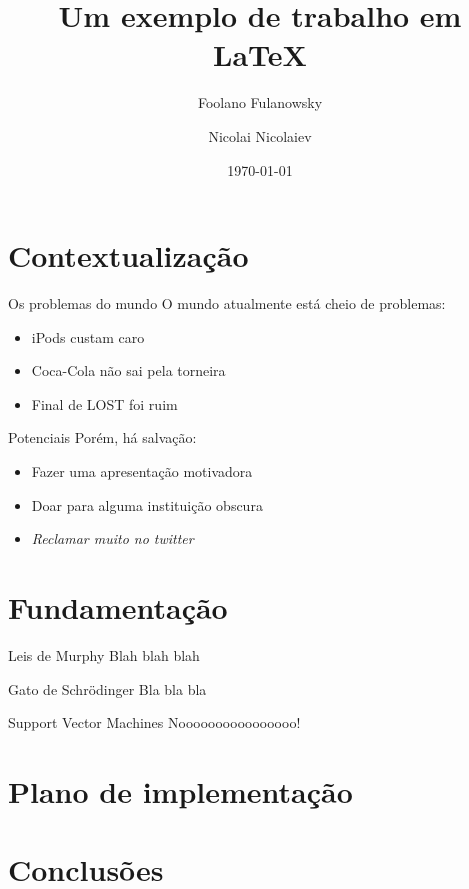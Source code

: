 \documentclass{beamer}
\institute{Universidade Tuiuti do Paraná}
\author{Foolano Fulanowsky \and Nicolai Nicolaiev}
\title{Um exemplo de trabalho em \LaTeX{}}
\date{\today}
\begin{document}
\frame{\titlepage}

\section{Contextualização}
\begin{frame}{Os problemas do mundo}
O mundo atualmente está cheio de problemas:
\begin{itemize}
  \item iPods custam caro
  \item Coca-Cola não sai pela torneira
  \item Final de LOST foi ruim
\end{itemize}
\end{frame}
\begin{frame}{Potenciais}
Porém, há salvação:
\begin{itemize}
  \item Fazer uma apresentação motivadora
  \item Doar para alguma instituição obscura
  \item \emph{Reclamar muito no twitter}
\end{itemize}
\end{frame}

\section{Fundamentação}
\begin{frame}{Leis de Murphy}
 Blah blah blah
\end{frame}
\begin{frame}{Gato de Schrödinger}
 Bla bla bla
\end{frame}
\begin{frame}{Support Vector Machines}
 Noooooooooooooooo!
\end{frame}

\section{Plano de implementação}

\section{Conclusões}
\end{document}
